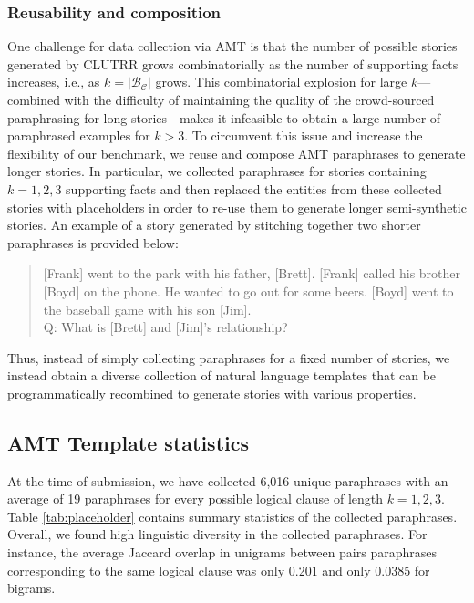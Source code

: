 \documentclass[letterpaper, 12pt]{report}
\begin{document}
\subsubsection{Reusability and composition}
One challenge for data collection via AMT is that the number of possible stories generated by CLUTRR grows combinatorially as the number of supporting facts increases, i.e., as  $k=|\mathcal{B}_{\mathcal{C}}|$ grows.
This combinatorial explosion for large $k$---combined with the difficulty of maintaining the quality of the crowd-sourced paraphrasing for long stories---makes it infeasible to obtain a large number of paraphrased examples for $k>3$.
To circumvent this issue and increase the flexibility of our benchmark, we reuse and compose AMT paraphrases to generate longer stories.
In particular, we collected paraphrases for stories containing $k=1,2,3$ supporting facts and then replaced the entities from these collected stories with placeholders in order to re-use them to generate longer semi-synthetic stories.
An example of a story generated by stitching together two shorter paraphrases is provided below:
\vspace{-5pt}
\begin{quote}{\small
    [Frank] went to the park with his father, [Brett]. [Frank] called his brother [Boyd] on the phone. He wanted to go out for some beers.
    [Boyd] went to the baseball game with his son [Jim].\\
    Q: What is [Brett] and [Jim]'s relationship?}
\end{quote}
\vspace{-5pt}
Thus, instead of simply collecting paraphrases for a fixed number of stories, we instead obtain a diverse collection of natural language templates that can be programmatically recombined to generate stories with various properties.

\subsection{AMT Template statistics}




At the time of submission, we have collected 6,016 unique paraphrases with an average of 19 paraphrases for every possible logical clause of length $k=1,2,3$. Table \ref{tab:placeholder} contains summary statistics of the collected paraphrases.
Overall, we found high linguistic diversity in the collected paraphrases.
For instance, the average Jaccard overlap in unigrams between pairs paraphrases corresponding to the same logical clause was only 0.201 and only 0.0385 for bigrams.
\end{document}
